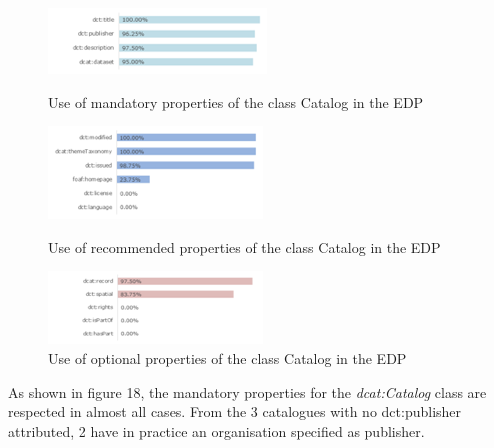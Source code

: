 \documentclass[<options>]{elsarticle}
\begin{document}
\begin{figure}[!h]
\includegraphics{replace16.png}
\caption{Use of mandatory properties of the class Catalog in the EDP}
\includegraphics{replace17.png}
\caption{Use of recommended properties of the class Catalog in the EDP}
\includegraphics{replace18.png}
\caption{Use of optional properties of the class Catalog in the EDP}
\end{figure}

As shown in figure 18, the mandatory properties for the \textit{dcat:Catalog} class are respected in almost all cases. From the 3 catalogues with no dct:publisher attributed, 2  have in practice an organisation specified as publisher.
\end{document}
